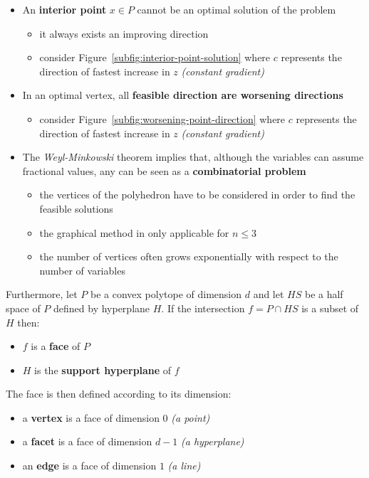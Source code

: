 \documentclass[english]{article}
\begin{document}
\begin{itemize}
  \item An \textbf{interior point} \(x \in P\) cannot be an optimal solution of the problem
        \begin{itemize}
          \item it always exists an improving direction
          \item consider Figure~\ref{subfig:interior-point-solution} where \(c\) represents the direction of fastest increase in \(z\) \textit{(constant gradient)}
        \end{itemize}
  \item In an optimal vertex, all \textbf{feasible direction are worsening directions}
        \begin{itemize}
          \item consider Figure~\ref{subfig:worsening-point-direction} where \(c\) represents the direction of fastest increase in \(z\) \textit{(constant gradient)}
        \end{itemize}
  \item The \textit{Weyl-Minkowski} theorem implies that, although the variables can assume fractional values, any \LP can be seen as a \textbf{combinatorial problem}
        \begin{itemize}
          \item {} the vertices of the polyhedron have to be considered in order to find the feasible solutions
          \item the graphical method in only applicable for \(n \leq 3\)
          \item the number of vertices often grows exponentially with respect to the number of variables
        \end{itemize}
\end{itemize}

\bigskip
Furthermore, let \(P\) be a convex polytope of dimension \(d\) and let \(HS\) be a half space of \(P\) defined by hyperplane \(H\).
If the intersection \(f = P \cap HS\) is a subset of \(H\) then:

\begin{itemize}
  \item \(f\) is a \textbf{face} of \(P\)
  \item \(H\) is the \textbf{support hyperplane} of \(f\)
\end{itemize}

The face is then defined according to its dimension:

\begin{itemize}
  \item a \textbf{vertex} is a face of dimension \(0\) \textit{(a point)}
  \item a \textbf{facet} is a face of dimension \(d-1\) \textit{(a hyperplane)}
  \item an \textbf{edge} is a face of dimension \(1\) \textit{(a line)}
\end{itemize}
\end{document}
